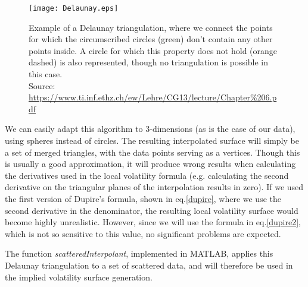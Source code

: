 \begin{figure}[!htb]
    \centering
      \texttt{[image: Delaunay.eps]}
      \caption[Example of a Delaunay triangulation, where we connect the points for which the circumscribed circles don't contain any other points inside. A circle for which this property does not hold is also represented, though no triangulation is possible in this case.]{Example of a Delaunay triangulation, where we connect the points for which the circumscribed circles (green) don't contain any other points inside. A circle for which this property does not hold (orange dashed) is also represented, though no triangulation is possible in this case.\\{\small Source: \url{https://www.ti.inf.ethz.ch/ew/Lehre/CG13/lecture/Chapter\%206.pdf}}}\label{fig:Delaunay}
    \end{figure}

 We can easily adapt this algorithm to 3-dimensions (as is the case of our data), using spheres instead of circles.
The resulting interpolated surface will simply be a set of merged triangles, with the data points serving as a vertices. Though this is usually a good approximation, it will produce wrong results when calculating the derivatives used in the local volatility formula (e.g. calculating the second derivative on the triangular planes of the interpolation results in zero). If we used the first version of Dupire's formula, shown in eq.\eqref{dupire}, where we use the second derivative in the denominator, the resulting local volatility surface would become highly unrealistic. However, since we will use the formula in eq.\eqref{dupire2}, which is not so sensitive to this value, no significant problems are expected.

The function \emph{scatteredInterpolant}, implemented in MATLAB, applies this Delaunay triangulation to a set of scattered data, and will therefore be used in the implied volatility surface generation.


